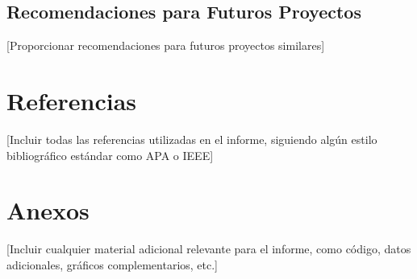 \documentclass[12pt,letterpaper]{report}
\begin{document}
\section{Recomendaciones para Futuros Proyectos}
[Proporcionar recomendaciones para futuros proyectos similares]

\chapter*{Referencias}

[Incluir todas las referencias utilizadas en el informe, siguiendo algún estilo bibliográfico estándar como APA o IEEE]

\chapter*{Anexos}

[Incluir cualquier material adicional relevante para el informe, como código, datos adicionales, gráficos complementarios, etc.]
\end{document}
